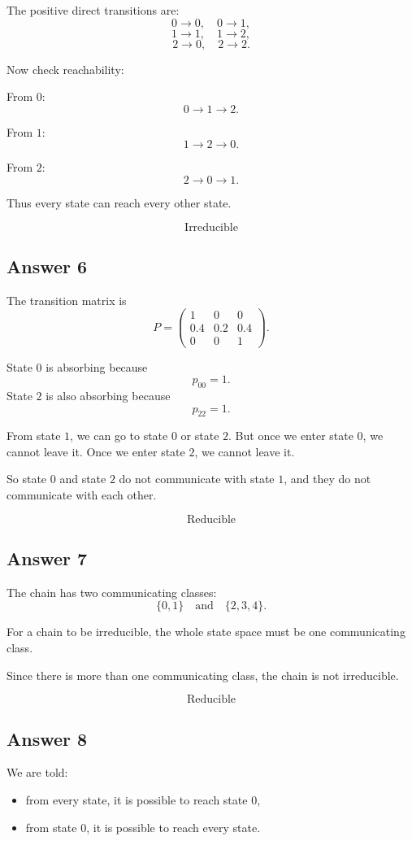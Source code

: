 \documentclass[12pt,a4paper]{article}
\theoremstyle{notestyle}
\begin{document}
The positive direct transitions are:
\[
0\to 0,\quad 0\to 1,
\]
\[
1\to 1,\quad 1\to 2,
\]
\[
2\to 0,\quad 2\to 2.
\]

Now check reachability:

From $0$:
\[
0\to 1\to 2.
\]

From $1$:
\[
1\to 2\to 0.
\]

From $2$:
\[
2\to 0\to 1.
\]

Thus every state can reach every other state.

\[
\boxed{\text{Irreducible}}
\]

\subsection*{Answer 6}

The transition matrix is
\[
P=
\begin{pmatrix}
1 & 0 & 0\\
0.4 & 0.2 & 0.4\\
0 & 0 & 1
\end{pmatrix}.
\]

State $0$ is absorbing because
\[
p_{00}=1.
\]
State $2$ is also absorbing because
\[
p_{22}=1.
\]

From state $1$, we can go to state $0$ or state $2$. But once we enter state $0$, we cannot leave it. Once we enter state $2$, we cannot leave it.

So state $0$ and state $2$ do not communicate with state $1$, and they do not communicate with each other.

\[
\boxed{\text{Reducible}}
\]

\subsection*{Answer 7}

The chain has two communicating classes:
\[
\{0,1\}
\quad\text{and}\quad
\{2,3,4\}.
\]

For a chain to be irreducible, the whole state space must be one communicating class.

Since there is more than one communicating class, the chain is not irreducible.

\[
\boxed{\text{Reducible}}
\]

\subsection*{Answer 8}

We are told:
\begin{itemize}[leftmargin=1.2cm]
    \item from every state, it is possible to reach state $0$,
    \item from state $0$, it is possible to reach every state.
\end{itemize}
\end{document}

